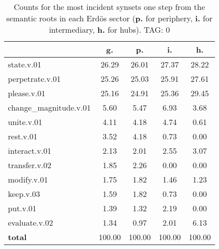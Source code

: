 \begin{table}[h!]
\begin{center}
\begin{tabular}{| l | c | c | c | c |}\hline
 & g. & p. & i. & h. \\\hline
state.v.01 & 26.29  & 26.01  & 27.37  & 28.22 \\\hline
perpetrate.v.01 & 25.26  & 25.03  & 25.91  & 27.61 \\\hline
please.v.01 & 25.16  & 24.91  & 25.36  & 29.45 \\\hline
change\_magnitude.v.01 & 5.60  & 5.47  & 6.93  & 3.68 \\\hline
unite.v.01 & 4.11  & 4.18  & 4.74  & 0.61 \\\hline
rest.v.01 & 3.52  & 4.18  & 0.73  & 0.00 \\\hline
interact.v.01 & 2.13  & 2.01  & 2.55  & 3.07 \\\hline
transfer.v.02 & 1.85  & 2.26  & 0.00  & 0.00 \\\hline
modify.v.01 & 1.75  & 1.82  & 1.46  & 1.23 \\\hline
keep.v.03 & 1.59  & 1.82  & 0.73  & 0.00 \\\hline
put.v.01 & 1.39  & 1.32  & 2.19  & 0.00 \\\hline
evaluate.v.02 & 1.34  & 0.97  & 2.01  & 6.13 \\\hline
{{\bf total}} & 100.00  & 100.00  & 100.00  & 100.00 \\\hline
\end{tabular}
\caption{Counts for the most incident synsets one step from the semantic roots in each Erd\"os sector ({\bf p.} for periphery, {\bf i.} for intermediary, {\bf h.} for hubs). TAG: 0}
\end{center}
\end{table}